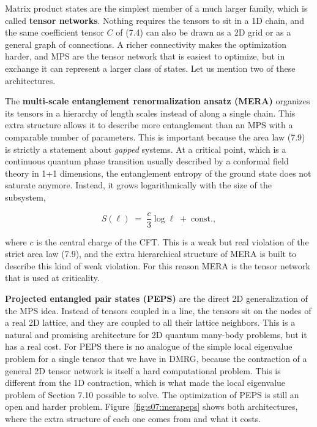 Matrix product states are the simplest member of a much larger family, which is called \textbf{tensor
networks}. Nothing requires the tensors to sit in a 1D chain, and the same coefficient tensor $C$
of (7.4) can also be drawn as a 2D grid or as a general graph of connections. A richer connectivity
makes the optimization harder, and MPS are the tensor network that is easiest to optimize, but in
exchange it can represent a larger class of states. Let us mention two of these architectures.

The \textbf{multi-scale entanglement renormalization ansatz (MERA)} organizes its tensors in a
hierarchy of length scales instead of along a single chain. This extra structure allows it to
describe more entanglement than an MPS with a comparable number of parameters. This is important
because the area law (7.9) is strictly a statement about \emph{gapped} systems. At a critical point,
which is a continuous quantum phase transition usually described by a conformal field theory in 1+1
dimensions, the entanglement entropy of the ground state does not saturate anymore. Instead, it grows
logarithmically with the size of the subsystem,

\begin{equation}
S(\ell) \;=\; \frac{c}{3}\log \ell \;+\; \text{const.},
\end{equation}

where $c$ is the central charge of the CFT. This is a weak but real violation of the strict area
law (7.9), and the extra hierarchical structure of MERA is built to describe this kind of weak
violation. For this reason MERA is the tensor network that is used at criticality.

\textbf{Projected entangled pair states (PEPS)} are the direct 2D generalization of the MPS idea.
Instead of tensors coupled in a line, the tensors sit on the nodes of a real 2D lattice, and they are
coupled to all their lattice neighbors. This is a natural and promising architecture for 2D quantum
many-body problems, but it has a real cost. For PEPS there is no analogue of the simple local
eigenvalue problem for a single tensor that we have in DMRG, because the contraction of a general 2D
tensor network is itself a hard computational problem. This is different from the 1D contraction,
which is what made the local eigenvalue problem of Section 7.10 possible to solve. The optimization of
PEPS is still an open and harder problem. Figure~\ref{fig:s07:merapeps} shows both architectures,
where the extra structure of each one comes from and what it costs.

